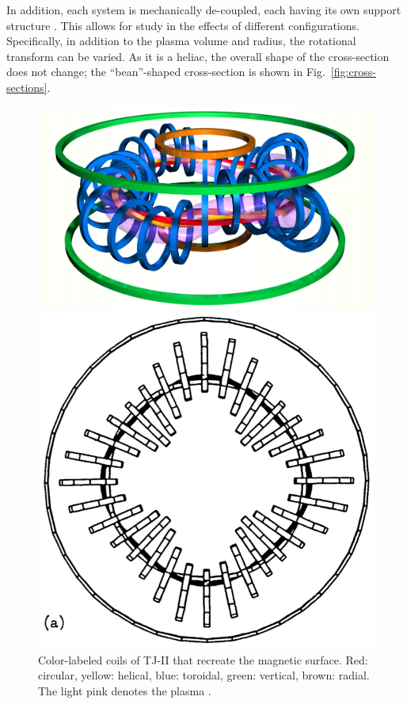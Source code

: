 \documentclass[a4paper]{article}
\begin{document}
In addition, each system is mechanically de-coupled, each having its own support structure \cite{ascasibar_overview_2001}.
This allows for study in the effects of different configurations.
Specifically, in addition to the plasma volume and radius, the rotational transform can be varied.
As it is a heliac, the overall shape of the cross-section does not change; the ``bean''-shaped cross-section is shown in Fig.~\ref{fig:cross-sections}.

\begin{figure}[tb]
\centering
\begin{minipage}{0.5\linewidth}
	\includegraphics[width=\linewidth]{../Graphics/TJ-II_Coils.png}
	\caption{Color-labeled coils of TJ-II that recreate the magnetic surface. Red: circular, yellow: helical, blue: toroidal, green: vertical, brown: radial. The light pink denotes the plasma \cite{tj-ii_nodate}.}
	\label{fig:coils}
\end{minipage}
\hfill\vrule\hfill
\begin{minipage}{0.46\linewidth}
	\includegraphics[width=\linewidth]{../Graphics/TJ-II_overhead.png}

\end{minipage}
\end{figure}
\end{document}
